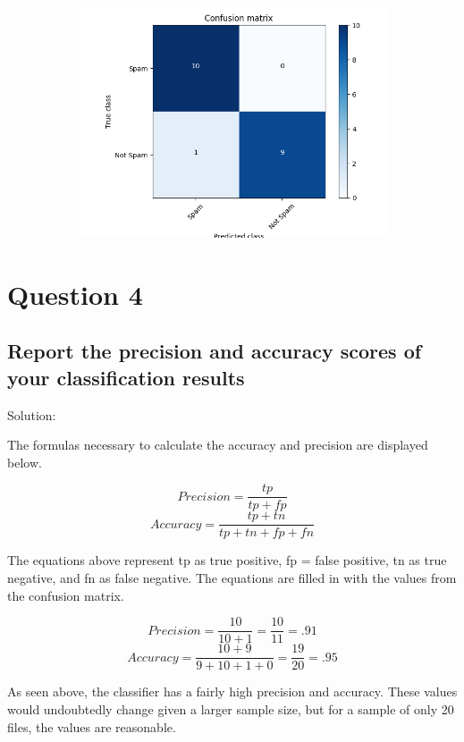 \documentclass[11pt]{scrartcl} %
\begin{document}
\begin{figure}[h!]
  \centering
  \begin{subfigure}[b]{\linewidth}
    \includegraphics[width=\linewidth, height=.5\textheight]{../Figures/confusionMatrix.png}
  \end{subfigure}
\end{figure}



\pagebreak

\section*{Question 4}


\subsection*{Report the precision and accuracy scores of your classification results}

\bigskip\bigskip
\LARGE Solution: \newline\newline\small

\tabto{2.0 cm} The formulas necessary to calculate the accuracy and precision are displayed below.

$$ Precision = \frac{tp}{tp + fp}$$
$$ Accuracy = \frac{tp + tn}{tp + tn + fp + fn} $$

\bigskip \bigskip

\tabto{2.0cm} The equations above represent tp as true positive, fp = false positive, tn as true negative, and  fn as false negative. The equations are filled in with the values from the confusion matrix.

\bigskip
$$ Precision = \frac{10}{10+1} = \frac{10}{11} = .91$$
$$ Accuracy = \frac{10 + 9}{9+10+1+0} = \frac{19}{20} = .95 $$
\bigskip \bigskip

\tabto{2.0cm} As seen above, the classifier has a fairly high precision and accuracy. These values would undoubtedly change given a larger sample size, but for a sample of only 20 files, the values are reasonable.
\end{document}

